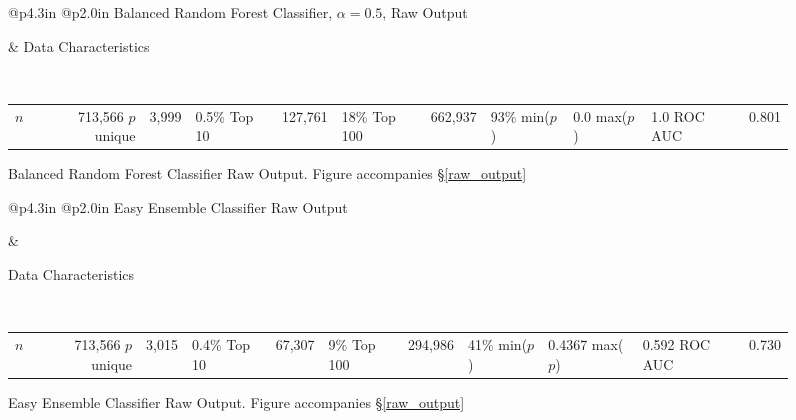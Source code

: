 \begin{figure}[h]

\noindent\begin{tabular}{@{\hspace{-6pt}}p{4.3in} @{\hspace{-6pt}}p{2.0in}}
	\vskip 0pt
	\hfil {\normalfont\normalsize Balanced Random Forest Classifier, $\alpha = 0.5$, Raw Output}
	
		
&
	\normalfont\normalsize 
	\vskip 0pt
	Data Characteristics
	
	\
	
	\begin{tabular}{rrr}
		$n$ & 713,566   \cr
		$p$ unique & 3,999 & 0.5\% \cr
		Top 10 & 127,761 & 18\%\cr
		Top 100 & 662,937 & 93\% \cr
		min($p$) & 0.0 \cr
		max($p$) & 1.0 \cr
		ROC AUC & 0.801 \cr
	\end{tabular}
\cr
\end{tabular}

\caption{\normalfont\normalsize Balanced Random Forest Classifier Raw Output.  Figure accompanies \S\ref{raw_output}}
\label{BRFC_raw}
\end{figure}

\begin{figure}[h]


\noindent\begin{tabular}{@{\hspace{-6pt}}p{4.3in} @{\hspace{-6pt}}p{2.0in}}
	\vskip 0pt
	\hfil {\normalfont\normalsize Easy Ensemble Classifier Raw Output}
	
		
&
	\normalfont\normalsize 
	\vskip 0pt
	
	Data Characteristics
	
	\
	
	\begin{tabular}{rrr}
		$n$ & 713,566 \cr
		$p$ unique & 3,015 & 0.4\% \cr
		Top 10 & 67,307 & 9\% \cr
		Top 100 & 294,986 & 41\% \cr
		min($p$) & 0.4367 \cr
		max($p$) & 0.592 \cr
		ROC AUC & 0.730 \cr
	\end{tabular}
\cr
\end{tabular}

\caption{\normalfont\normalsize Easy Ensemble Classifier Raw Output.  Figure accompanies \S\ref{raw_output}}
\label{EEC_raw}
\end{figure}

